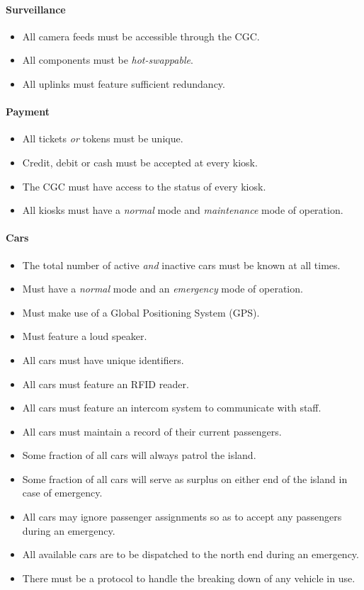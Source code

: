 \documentclass[12pt]{article}
\begin{document}
	\paragraph{Surveillance}
	\begin{itemize}
		\item[] All camera feeds must be accessible through the CGC.
		\item[] All components must be \textit{hot-swappable}.
		\item[] All uplinks must feature sufficient redundancy. 
	\end{itemize}
	
	\paragraph{Payment}
	\begin{itemize}
		\item[] All tickets \textit{or} tokens must be unique.
		\item[] Credit, debit or cash must be accepted at every kiosk.
		\item[] The CGC must have access to the status of every kiosk.
		\item[] All kiosks must have a \textit{normal} mode and \textit{maintenance} mode of operation.
	\end{itemize}
	
	\paragraph{Cars}
	\begin{itemize}
		\item[] The total number of active \textit{and} inactive cars must be known at all times.
		\item[] Must have a \textit{normal} mode and an \textit{emergency} mode of operation.
		\item[] Must make use of a Global Positioning System (GPS).
		\item[] Must feature a loud speaker.
		\item[] All cars must have unique identifiers.
		\item[] All cars must feature an RFID reader.
		\item[] All cars must feature an intercom system to communicate with staff.
		\item[] All cars must maintain a record of their current passengers.
		\item[] Some fraction of all cars will always patrol the island.
		\item[] Some fraction of all cars will serve as surplus on either end of the island in case of emergency.
		\item[] All cars may ignore passenger assignments so as to accept any passengers during an emergency.
		\item[] All available cars are to be dispatched to the north end during an emergency.
		\item[] There must be a protocol to handle the breaking down of any vehicle in use.
	\end{itemize}
	
\end{document}
